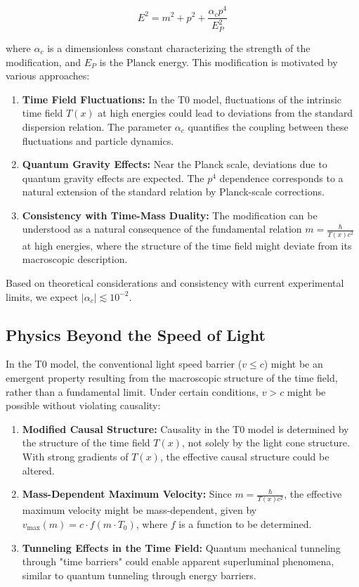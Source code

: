 \documentclass[12pt,a4paper]{article}
\newcommand{\Tfield}{T(x)}
\newcommand{\Tzero}{T_0}
\begin{document}
	\begin{equation}
		E^2 = m^2 + p^2 + \frac{\alpha_c p^4}{E_P^2}
	\end{equation}
	
	where \(\alpha_c\) is a dimensionless constant characterizing the strength of the modification, and \(E_P\) is the Planck energy. This modification is motivated by various approaches:
	
	\begin{enumerate}
		\item \textbf{Time Field Fluctuations:} In the T0 model, fluctuations of the intrinsic time field \(\Tfield\) at high energies could lead to deviations from the standard dispersion relation. The parameter \(\alpha_c\) quantifies the coupling between these fluctuations and particle dynamics.
		\item \textbf{Quantum Gravity Effects:} Near the Planck scale, deviations due to quantum gravity effects are expected. The \(p^4\) dependence corresponds to a natural extension of the standard relation by Planck-scale corrections.
		\item \textbf{Consistency with Time-Mass Duality:} The modification can be understood as a natural consequence of the fundamental relation \(m = \frac{\hbar}{\Tfield c^2}\) at high energies, where the structure of the time field might deviate from its macroscopic description.
	\end{enumerate}
	
	Based on theoretical considerations and consistency with current experimental limits, we expect \(|\alpha_c| \lesssim 10^{-2}\).
	
	\subsection{Physics Beyond the Speed of Light}
	
	In the T0 model, the conventional light speed barrier (\(v \leq c\)) might be an emergent property resulting from the macroscopic structure of the time field, rather than a fundamental limit. Under certain conditions, \(v > c\) might be possible without violating causality:
	
	\begin{enumerate}
		\item \textbf{Modified Causal Structure:} Causality in the T0 model is determined by the structure of the time field \(\Tfield\), not solely by the light cone structure. With strong gradients of \(\Tfield\), the effective causal structure could be altered.
		\item \textbf{Mass-Dependent Maximum Velocity:} Since \(m = \frac{\hbar}{\Tfield c^2}\), the effective maximum velocity might be mass-dependent, given by \(v_{\text{max}}(m) = c \cdot f(m \cdot \Tzero)\), where \(f\) is a function to be determined.
		\item \textbf{Tunneling Effects in the Time Field:} Quantum mechanical tunneling through "time barriers" could enable apparent superluminal phenomena, similar to quantum tunneling through energy barriers.
	\end{enumerate}
	
\end{document}
